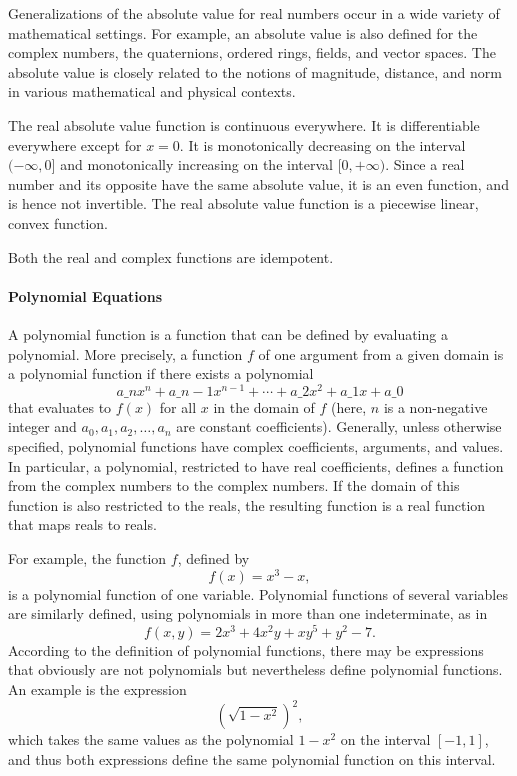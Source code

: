 Generalizations of the absolute value for real numbers occur in a wide variety of mathematical settings. For example, an absolute value is also defined for the complex numbers, the quaternions, ordered rings, fields, and vector spaces. The absolute value is closely related to the notions of magnitude, distance, and norm in various mathematical and physical contexts.

The real absolute value function is continuous everywhere. It is differentiable everywhere except for $x = 0$. It is monotonically decreasing on the interval $(-\infty, 0]$ and monotonically increasing on the interval $[0, +\infty)$. Since a real number and its opposite have the same absolute value, it is an even function, and is hence not invertible. The real absolute value function is a piecewise linear, convex function.

Both the real and complex functions are idempotent.

\paragraph{Polynomial Equations}

A polynomial function is a function that can be defined by evaluating a polynomial. More precisely, a function $f$ of one argument from a given domain is a polynomial function if there exists a polynomial
$$
a\_{n}x^{n} + a\_{n-1}x^{n-1} + \cdots + a\_{2}x^{2} + a\_{1}x + a\_{0}
$$
that evaluates to $f(x)$ for all $x$ in the domain of $f$ (here, $n$ is a non-negative integer and $a_{0}, a_{1}, a_{2}, \ldots, a_{n}$ are constant coefficients). Generally, unless otherwise specified, polynomial functions have complex coefficients, arguments, and values. In particular, a polynomial, restricted to have real coefficients, defines a function from the complex numbers to the complex numbers. If the domain of this function is also restricted to the reals, the resulting function is a real function that maps reals to reals.

For example, the function $f$, defined by
$$
f(x) = x^{3} - x,
$$
is a polynomial function of one variable. Polynomial functions of several variables are similarly defined, using polynomials in more than one indeterminate, as in
$$
f(x, y) = 2x^{3} + 4x^{2}y + xy^{5} + y^{2} - 7.
$$
According to the definition of polynomial functions, there may be expressions that obviously are not polynomials but nevertheless define polynomial functions. An example is the expression
$$
\left(\sqrt{1 - x^{2}}\right)^{2},
$$
which takes the same values as the polynomial $1 - x^{2}$ on the interval $[-1, 1]$, and thus both expressions define the same polynomial function on this interval.


